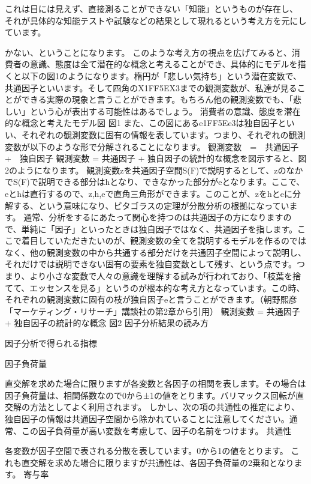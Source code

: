 \documentclass[a4j,11pt,mc]{jreport}
\begin{document}
これは目には見えず、直接測ることができない「知能」というものが存在し、
それが具体的な知能テストや試験などの結果として現れるという考え方を元にしています。


かない、ということになります。
このような考え方の視点を広げてみると、消費者の意識、態度は全て潜在的な概念と考えることができ、具体的にモデルを描くと以下の図1のようになります。楕円が「悲しい気持ち」という潜在変数で、共通因子といいます。そして四角のX1{FF5E}X3までの観測変数が、私達が見ることができる実際の現象と言うことができます。もちろん他の観測変数でも、「悲しい」という心が表出する可能性はあるでしょう。
消費者の意識、態度を潜在的な概念と考えたモデル図
図1
また、この図にあるe1{FF5E}e3は独自因子といい、それぞれの観測変数に固有の情報を表しています。つまり、それぞれの観測変数が以下のような形で分解されることになります。
観測変数　=　共通因子　+　独自因子
観測変数 = 共通因子 + 独自因子の統計的な概念を図示すると、図2のようになります。
観測変数zを共通因子空間S(F)で説明するとして、zのなかでS(F)で説明できる部分はhとなり、できなかった部分がeとなります。ここで、eとhは直行するので、z,h,eで直角三角形ができます。このことが、zをhとeに分解する、という意味になり、ピタゴラスの定理が分散分析の根拠になっています。
通常、分析をするにあたって関心を持つのは共通因子の方になりますので、単純に「因子」といったときは独自因子ではなく、共通因子を指します。ここで着目していただきたいのが、観測変数の全てを説明するモデルを作るのではなく、他の観測変数の中から共通する部分だけを共通因子空間によって説明し、それだけでは説明できない固有の要素を独自変数として残す、という点です。つまり、より小さな変数で人々の意識を理解する試みが行われており、「枝葉を捨てて、エッセンスを見る」というのが根本的な考え方となっています。この時、それぞれの観測変数に固有の枝が独自因子eと言うことができます。（朝野熙彦「マーケティング・リサーチ」講談社の第2章から引用）
観測変数 = 共通因子 + 独自因子の統計的な概念
図2
因子分析結果の読み方

因子分析で得られる指標

	因子負荷量

	直交解を求めた場合に限りますが各変数と各因子の相関を表します。その場合は因子負荷量は、相関係数なので0から±1の値をとります。バリマックス回転が直交解の方法としてよく利用されます。
	しかし、次の項の共通性の推定により、独自因子の情報は共通因子空間から除かれていることに注意してください。通常、この因子負荷量が高い変数を考慮して、因子の名前をつけます。
	共通性

	各変数が因子空間で表される分散を表しています。0から1の値をとります。
	これも直交解を求めた場合に限りますが共通性は、各因子負荷量の2乗和となります。
	寄与率
\end{document}
